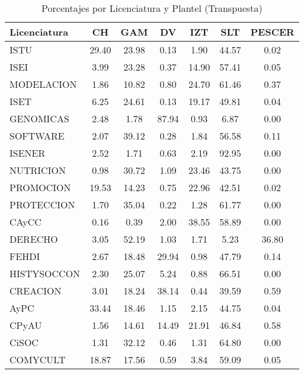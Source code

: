 \documentclass{article}
\begin{document}
\begin{table}[ht]
\centering
\caption{Porcentajes por Licenciatura y Plantel (Transpuesta)}
\label{tab:porcentajes_transpuesta}
\begin{tabular}{|l|c|c|c|c|c|c|}
\hline
Licenciatura & CH & GAM & DV & IZT & SLT & PESCER \\ \hline\hline
ISTU & 29.40 & 23.98 & 0.13 & 1.90 & 44.57 & 0.02 \\
ISEI & 3.99 & 23.28 & 0.37 & 14.90 & 57.41 & 0.05 \\
MODELACION & 1.86 & 10.82 & 0.80 & 24.70 & 61.46 & 0.37 \\\hline
ISET & 6.25 & 24.61 & 0.13 & 19.17 & 49.81 & 0.04 \\
GENOMICAS & 2.48 & 1.78 & 87.94 & 0.93 & 6.87 & 0.00 \\
SOFTWARE & 2.07 & 39.12 & 0.28 & 1.84 & 56.58 & 0.11 \\
ISENER & 2.52 & 1.71 & 0.63 & 2.19 & 92.95 & 0.00 \\\hline\hline
NUTRICION & 0.98 & 30.72 & 1.09 & 23.46 & 43.75 & 0.00 \\
PROMOCION & 19.53 & 14.23 & 0.75 & 22.96 & 42.51 & 0.02 \\
PROTECCION & 1.70 & 35.04 & 0.22 & 1.28 & 61.77 & 0.00 \\
CAyCC & 0.16 & 0.39 & 2.00 & 38.55 & 58.89 & 0.00 \\\hline\hline
DERECHO & 3.05 & 52.19 & 1.03 & 1.71 & 5.23 & 36.80 \\
FEHDI & 2.67 & 18.48 & 29.94 & 0.98 & 47.79 & 0.14 \\
HISTYSOCCON & 2.30 & 25.07 & 5.24 & 0.88 & 66.51 & 0.00 \\
CREACION & 3.01 & 18.24 & 38.14 & 0.44 & 39.59 & 0.59 \\\hline
AyPC & 33.44 & 18.46 & 1.15 & 2.15 & 44.75 & 0.04 \\
CPyAU & 1.56 & 14.61 & 14.49 & 21.91 & 46.84 & 0.58 \\
CiSOC & 1.31 & 32.12 & 0.46 & 1.31 & 64.80 & 0.00 \\
COMYCULT & 18.87 & 17.56 & 0.59 & 3.84 & 59.09 & 0.05 \\
\hline
\end{tabular}
\end{table}
\end{document}
